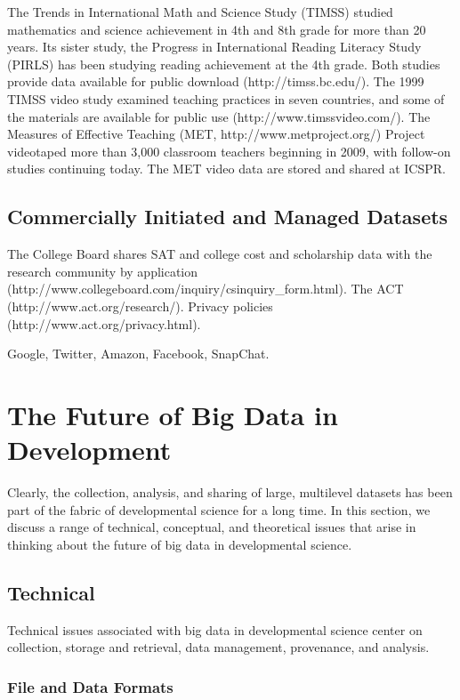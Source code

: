 \documentclass[letterpaper,man,apacite]{apa6}
\begin{document}
The Trends in International Math and Science Study (TIMSS) studied mathematics and science achievement in 4th and 8th grade for more than 20 years.
Its sister study, the Progress in International Reading Literacy Study (PIRLS) has been studying reading achievement at the 4th grade.
Both studies provide data available for public download (http://timss.bc.edu/).
The 1999 TIMSS video study examined teaching practices in seven countries, and some of the materials are available for public use (http://www.timssvideo.com/).
The Measures of Effective Teaching (MET, http://www.metproject.org/) Project videotaped more than 3,000 classroom teachers beginning in 2009, with follow-on studies continuing today.
The MET video data are stored and shared at ICSPR.

\subsection{Commercially Initiated and Managed Datasets}

The College Board shares SAT and college cost and scholarship data with the research community by application (http://www.collegeboard.com/inquiry/csinquiry_form.html).
The ACT (http://www.act.org/research/). Privacy policies (http://www.act.org/privacy.html). 

Google, Twitter, Amazon, Facebook, SnapChat.

\section{The Future of Big Data in Development}

Clearly, the collection, analysis, and sharing of large, multilevel datasets has been part of the fabric of developmental science for a long time.
In this section, we discuss a range of technical, conceptual, and theoretical issues that arise in thinking about the future of big data in developmental science. 

\subsection{Technical}

Technical issues associated with big data in developmental science center on collection, storage and retrieval, data management, provenance, and analysis. 

\subsubsection{File and Data Formats}
\end{document}
